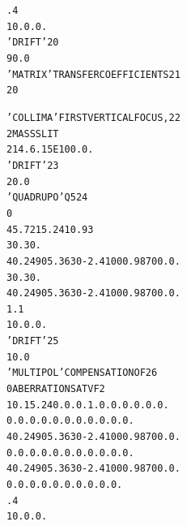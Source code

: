 \begin{tiny}
\begin{alltt}
     .4                                                                         
    1  0. 0. 0.                                                                 
   'DRIFT'                                                                20
     90.0                                                                       
   'MATRIX'                            TRANSFER  COEFFICIENTS             21
   2 0                                                                          
\end{alltt}
\newpage
\begin{alltt}
   'COLLIMA'                           FIRST  VERTICAL  FOCUS,            22
    2                                  MASS  SLIT                             
   2  14.6  .15E10  0. 0.                                                       
   'DRIFT'                                                                23
     20.0                                                                       
   'QUADRUPO'                            Q5                               24
   0                                                        
    45.72  15.24   10.93                                                        
    30. 30.                                                                     
    4    0.2490   5.3630  -2.4100   0.9870   0.   0.                            
    30. 30.                                                                     
    4    0.2490   5.3630  -2.4100   0.9870   0.   0.                            
   1.1                                                                          
    1  0. 0. 0.                                                                 
   'DRIFT'                                                                25
     10.0                                                                       
   'MULTIPOL'                          COMPENSATION  OF                   26
   0                                   ABERRATIONS  AT  VF2                   
    10.  15.24  0. 0.  0.  1.  0. 0. 0. 0. 0. 0.                                
    0. 0.  0. 0. 0. 0. 0. 0. 0. 0. 0.                                           
    4    0.2490   5.3630  -2.4100   0.9870   0.   0.                            
    0. 0.  0. 0. 0. 0. 0. 0. 0. 0. 0.                                           
    4    0.2490   5.3630  -2.4100   0.9870   0.   0.                            
   0. 0. 0. 0. 0. 0. 0. 0. 0. 0.                                                
    .4                                                                          
    1  0. 0. 0.                                                                 

\end{alltt}
\end{tiny}
